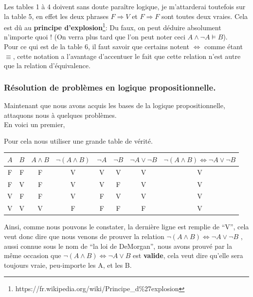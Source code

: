 \documentclass[a4paper, 12pt]{article}
\newcommand{\ffi}{\Leftrightarrow}
\newcommand{\imply}{\Rightarrow}
\numberwithin{equation}{subsection}
\begin{document}
  Les tables 1 à 4 doivent sans doute paraître logique, je m'attarderai toutefois sur la table 5, en effet les deux phrases $F \imply V$ et $F \imply F$ sont toutes deux vraies.
  Cela est dû au {\bf principe d'explosion}\footnote{https://fr.wikipedia.org/wiki/Principe\_d$\%$27explosion}: Du faux, on peut déduire absolument n'importe quoi ! (On verra plus tard que l'on peut noter ceci $A \land \neg A \models B$).\\

  Pour ce qui est de la table 6, il faut savoir que certains notent $\ffi$ comme étant $\equiv$, cette notation a l'avantage d'accentuer le fait que cette relation n'est autre que la relation d'équivalence.
  \subsubsection{Résolution de problèmes en logique propositionnelle.}
  Maintenant que nous avons acquis les bases de la logique propositionnelle,  attaquons nous à quelques problèmes.\\

  En voici un premier,
  \begin{center}
    \Ovalbox{$ \neg (A \land B ) \ffi \neg A \lor \neg B$}
  \end{center}
  Pour cela nous utiliser une grande table de vérité.
  \begin{table}[H]
    \centering
    \begin{tabular}{|c|c|c|c|c|c|c|c|}
      \hline $A$ & $B$ & $A \land B$ & $\neg (A \land B)$ & $\neg A$ & $\neg B$ & $\neg A \lor \neg B$ & $\neg (A \land B) \ffi \neg A \lor \neg B$ \\
      \hline  F  &  F  &      F      &          V         &     V    &     V    &          V           &                     V                      \\
              F  &  V  &      F      &          V         &     V    &     F    &          V           &                     V                      \\
              V  &  F  &      F      &          V         &     F    &     V    &          V           &                     V                      \\
              V  &  V  &      V      &          F         &     F    &     F    &          F           &                     V                      \\
      \hline
    \end{tabular}
  \end{table}
  Ainsi, comme nous pouvons le constater, la dernière ligne est remplie de ``V'', cela veut donc dire que nous venons de prouver la relation $\neg (A \land B) \ffi \neg A \lor \neg B$ , aussi connue sous le nom de ``la loi de DeMorgan'', nous avons prouvé par la même occasion que $\neg (A \land B) \ffi \neg A \lor B$ est {\bf valide}, cela veut dire qu'elle sera toujours vraie, peu-importe les A, et les B.\\
\end{document}
